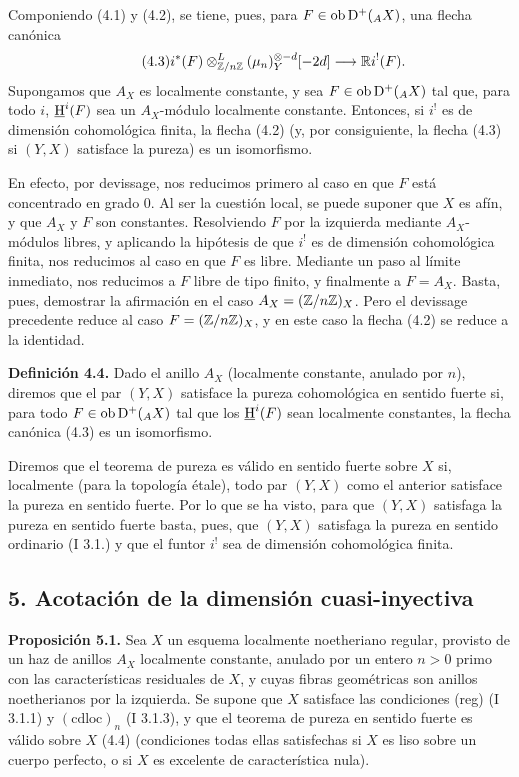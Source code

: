 Componiendo (4.1) y (4.2), se tiene, pues, para $F\in\operatorname{ob}\mathrm{D}^+({}_A X)$, una flecha canónica
\begin{equation}\tag{4.3}
        i^*(F)\otimes^L_{\mathbb{Z}/n\mathbb{Z}}(\mu_n)_Y^{\otimes -d}[-2d]\longrightarrow \mathbb{R} i^!(F).
\end{equation}
Supongamos que $A_X$ es localmente constante, y sea $F\in\operatorname{ob}\mathrm{D}^+({}_A X)$ tal que, para todo $i$, $\underline{\mathrm H}^i(F)$ sea un $A_X$-módulo localmente constante. Entonces, si $i^!$ es de dimensión cohomológica finita, la flecha (4.2) (y, por consiguiente, la flecha (4.3) si $(Y,X)$ satisface la pureza) es un isomorfismo.

En efecto, por devissage, nos reducimos primero al caso en que $F$ está concentrado en grado $0$. Al ser la cuestión local, se puede suponer que $X$ es afín, y que $A_X$ y $F$ son constantes. Resolviendo $F$ por la izquierda mediante $A_X$-módulos libres, y aplicando la hipótesis de que $i^!$ es de dimensión cohomológica finita, nos reducimos al caso en que $F$ es libre. Mediante un paso al límite inmediato, nos reducimos a $F$ libre de tipo finito, y finalmente a $F=A_X$. Basta, pues, demostrar la afirmación en el caso $A_X=(\mathbb{Z}/n\mathbb{Z})_X$. Pero el devissage precedente reduce al caso $F=(\mathbb{Z}/n\mathbb{Z})_X$, y en este caso la flecha (4.2) se reduce a la identidad.

\textbf{Definición 4.4.} Dado el anillo $A_X$ (localmente constante, anulado por $n$), diremos que el par $(Y,X)$ satisface la pureza cohomológica en sentido fuerte si, para todo $F\in\operatorname{ob}\mathrm{D}^+({}_A X)$ tal que los $\underline{\mathrm H}^i(F)$ sean localmente constantes, la flecha canónica (4.3) es un isomorfismo.

Diremos que el teorema de pureza es válido en sentido fuerte sobre $X$ si, localmente (para la topología étale), todo par $(Y,X)$ como el anterior satisface la pureza en sentido fuerte. Por lo que se ha visto, para que $(Y,X)$ satisfaga la pureza en sentido fuerte basta, pues, que $(Y,X)$ satisfaga la pureza en sentido ordinario (I 3.1.) y que el funtor $i^!$ sea de dimensión cohomológica finita.

\subsection*{5. Acotación de la dimensión cuasi-inyectiva}

\textbf{Proposición 5.1.} Sea $X$ un esquema localmente noetheriano regular, provisto de un haz de anillos $A_X$ localmente constante, anulado por un entero $n>0$ primo con las características residuales de $X$, y cuyas fibras geométricas son anillos noetherianos por la izquierda. Se supone que $X$ satisface las condiciones (reg) (I 3.1.1) y $(\mathrm{cdloc})_n$ (I 3.1.3), y que el teorema de pureza en sentido fuerte es válido sobre $X$ (4.4) (condiciones todas ellas satisfechas si $X$ es liso sobre un cuerpo perfecto, o si $X$ es excelente de característica nula).

